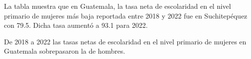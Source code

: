 La tabla muestra que en Guatemala, la tasa neta de escolaridad en el nivel primario de mujeres más baja reportada entre 2018 y 2022 fue en Suchitepéquez con 79.5. Dicha tasa aumentó a 93.1 para 2022.

De 2018 a 2022 las tasas netas de escolaridad en el nivel primario de mujeres en Guatemala sobrepasaron la de hombres. 